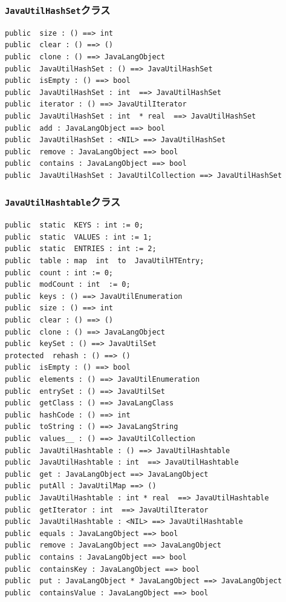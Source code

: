 \documentclass[\pformat,12pt]{jarticle}
\begin{document}
\subsubsection{\texttt{JavaUtilHashSet}クラス}
\begin{small}
\begin{verbatim}
public  size : () ==> int
public  clear : () ==> ()
public  clone : () ==> JavaLangObject
public  JavaUtilHashSet : () ==> JavaUtilHashSet
public  isEmpty : () ==> bool
public  JavaUtilHashSet : int  ==> JavaUtilHashSet
public  iterator : () ==> JavaUtilIterator
public  JavaUtilHashSet : int  * real  ==> JavaUtilHashSet
public  add : JavaLangObject ==> bool
public  JavaUtilHashSet : <NIL> ==> JavaUtilHashSet
public  remove : JavaLangObject ==> bool
public  contains : JavaLangObject ==> bool
public  JavaUtilHashSet : JavaUtilCollection ==> JavaUtilHashSet
\end{verbatim}
\end{small}

\subsubsection{\texttt{JavaUtilHashtable}クラス}
\begin{small}
\begin{verbatim}
public  static  KEYS : int := 0;
public  static  VALUES : int := 1;
public  static  ENTRIES : int := 2;
public  table : map  int  to  JavaUtilHTEntry;
public  count : int := 0;
public  modCount : int  := 0;
public  keys : () ==> JavaUtilEnumeration
public  size : () ==> int
public  clear : () ==> ()
public  clone : () ==> JavaLangObject
public  keySet : () ==> JavaUtilSet
protected  rehash : () ==> ()
public  isEmpty : () ==> bool
public  elements : () ==> JavaUtilEnumeration
public  entrySet : () ==> JavaUtilSet
public  getClass : () ==> JavaLangClass
public  hashCode : () ==> int
public  toString : () ==> JavaLangString
public  values__ : () ==> JavaUtilCollection
public  JavaUtilHashtable : () ==> JavaUtilHashtable
public  JavaUtilHashtable : int  ==> JavaUtilHashtable
public  get : JavaLangObject ==> JavaLangObject
public  putAll : JavaUtilMap ==> ()
public  JavaUtilHashtable : int * real  ==> JavaUtilHashtable
public  getIterator : int  ==> JavaUtilIterator
public  JavaUtilHashtable : <NIL> ==> JavaUtilHashtable
public  equals : JavaLangObject ==> bool
public  remove : JavaLangObject ==> JavaLangObject
public  contains : JavaLangObject ==> bool
public  containsKey : JavaLangObject ==> bool
public  put : JavaLangObject * JavaLangObject ==> JavaLangObject
public  containsValue : JavaLangObject ==> bool
\end{verbatim}
\end{small}
\end{document}
